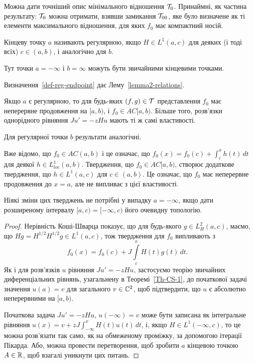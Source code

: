 Можна дати точніший опис мінімального відношення $\mathcal{T}_0$. Принаймні, як частина результату: $\mathcal{T}_0$ можна отримати, взявши замикання $\mathcal{T}_{00}$, яке було визначене як ті елементи максимального відношення, для яких $f_0$ має компактний носій.

\begin{definition}\label{def-reg-endpoint}
	Кінцеву точку $a$ називають регулярною, якщо $H\in L^1(a,c)$ для деяких (і тоді всіх) $c\in(a,b)$, і аналогічно для $b$.

	Тут точки $a=-\infty$ і $b=\infty$ можуть бути звичайними кінцевими точками.
\end{definition}

Визначення~\ref{def-reg-endpoint} дає Лему~\ref{lemma2-relations}.

\begin{lemma} \label{lemma2-relations}
	Якщо $a$ є регулярною, то для будь-яких $(f,g)\in\mathcal{T}$ представлення $f_0$ має неперервне продовження на $[a,b)$, і $f_0\in AC[a,b)$. Більше того, розв'язки однорідного рівняння $Ju'=-zHu$ мають ті ж самі властивості.

	Для регулярної точки $b$ результати аналогічні.
\end{lemma}

Вже відомо, що $f_0\in AC(a,b)$ і це означає, що $f_0(x)=f_0(c) + \int_c^x h(t)\,dt$ для деякої $h\in L^1_{loc}(a,b)$. Твердження, що $f_0\in AC[a,b)$, створює додаткове твердження, що $h\in L^1(a,c)$ для $c\in(a,b)$. Це означає, що $f_0$ має неперервне продовження до $x=a$, але не випливає з цієї властивості.

Ніякі зміни цих тверджень не потрібні у випадку $a=-\infty$, якщо дати розширеному інтервалу $[a,c)=[-\infty,c)$ його очевидну топологію.

\begin{proof}
	Нерівність Коші-Шварца показує, що для будь-якого $g\in L^2_H(a,c)$, маємо, що $Hg=H^{1/2}H^{1/2}g\in L^1(a,c)$, тож твердження для $f_0$ випливають з
	\begin{equation*}
	 	f_0(x) = f_0(c) + J\int\limits_c^x H(t)g(t)\,dt.
	 \end{equation*}
	Як і для розв'язків $u$ рівняння $Ju'=-zHu$, застосуємо теорію звичайних диференціальних рівнянь, узагальнену в Теоремі~\ref{Th-CS-1}, до початкової задачі значення $u(a)=v$ для загального $v\in\mathbb{C}^2$, щоб підтвердити, що $u$ є абсолютно неперервними на $[a,b)$.

	Початкова задача $Ju'=-zHu$, $u(-\infty)=v$ може бути записана як інтегральне рівняння $u(x)=v+zJ\int_{-\infty}^x H(t)u(t)\,dt$, і, якщо $H\in L^1(-\infty,c)$, то це можна розв'язати так само, як на обмеженому проміжку, за допомогою ітерації Пікарда. Або, можна провести перетворення, щоб зробити $a$ кінцевою точкою $A\in\mathbb{R}$, щоб взагалі уникнути цих питань.
\end{proof}

